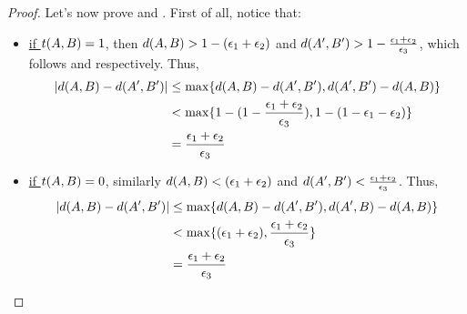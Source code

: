 \begin{lemma}[Lemma 5.17]
\begin{proof}
                Let's now prove  and .
                First of all, notice that:
                \begin{itemize}
                    \item \underline{if $t( A,B ) = 1$}, then $d( A,B ) > 1 - ( \epsilon_1 + \epsilon_2 )$
                        and $d ( A',B' ) > 1 - \frac{\epsilon_1 + \epsilon_2}{\epsilon_3}$, which follows
                         and
                         respectively.
                        Thus,
                        \begin{align*}
                            | d ( A,B ) - d ( A',B' ) |
                                & \leq \max \{ d ( A,B ) - d ( A',B' ), d ( A',B' ) - d ( A,B ) \} \\
                                & < \max \{  1 - ( 1 - \frac{\epsilon_1 + \epsilon_2}{\epsilon_3} ),
                                    1 - ( 1 - \epsilon_1 - \epsilon_2 ) \} \\
                                & = \frac{\epsilon_1 + \epsilon_2}{\epsilon_3}
                        \end{align*}
                    \item \underline{if $t( A,B ) = 0$}, similarly $d( A,B ) < ( \epsilon_1 + \epsilon_2 )$
                        and $d ( A',B' ) < \frac{\epsilon_1 + \epsilon_2}{\epsilon_3}$.
                        Thus,
                        \begin{align*}
                            | d ( A,B ) - d ( A',B' ) |
                                & \leq \max \{ d ( A,B ) - d ( A',B' ), d ( A',B ) - d ( A,B ) \} \\
                                & < \max \{ ( \epsilon_1 + \epsilon_2 ), \frac{\epsilon_1 + \epsilon_2}{\epsilon_3} \} \\
                                & = \frac{\epsilon_1 + \epsilon_2}{\epsilon_3}
                        \end{align*}

\end{itemize}
\end{proof}
\end{lemma}
